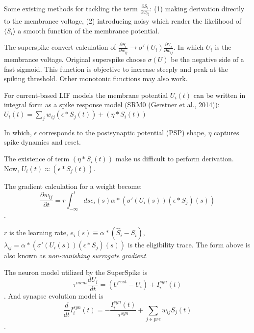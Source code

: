 Some existing methods for tackling the term $\frac{\partial S_i}{\partial w_{ij}}$:
(1) making derivation directly to the membrance voltage, 
(2) introducing noisy which render the likelihood of $\langle S_i \rangle$ a smooth function of the membrance potential.

The superspike convert calculation of $\frac{\partial S_i}{\partial w_{ij}}\rightarrow \sigma'(U_i)\frac{\partial U_i}{\partial w_{ij}}$.
In which $U_i$ is the membrance voltage.
Original superspike choose $\sigma(U)$ be the negative side of a fast sigmoid.
This function is objective to increase steeply and peak at the spiking threshold.
Other monotonic functions may also work.

For current-based LIF models the membrane potential $U_i(t)$ can be written in integral form as 
a spike response model (SRM0 (Gerstner et al., 2014)):
$U_i(t) = \sum_j w_{ij} (\epsilon * S_j(t)) + (\eta * S_i(t))$ 



In which, $\epsilon$ corresponds to the postsynaptic potential (PSP) shape, $\eta$ captures 
spike dynamics and reset.

The existence of term $(\eta * S_i(t))$ make us difficult to perform derivation. Now, 
$U_i(t)\approx (\epsilon * S_j(t))$.

The gradient calculation for a weight become:
$$\frac{\partial w_{ij}}{\partial t}=r\int_{-\infty}^t ds e_i(s) \alpha * (\sigma'(U_i(s))(\epsilon * S_j)(s))$$.

$r$ is the learning rate, $e_i(s)\equiv \alpha * (\hat S_i - S_i)$, $\lambda_{ij} = \alpha * (\sigma'(U_i(s))(\epsilon * S_j)(s))$
 is the eligibility trace. The form above is also known as \textit{non-vanishing surrogate gradient}.

The neuron model utilized by the SuperSpike is $$\tau^{mem}\frac{dU_i}{dt} = (U^{rest} -U_i) +I_i^{syn}(t)$$.
And synapse evolution model is $$\frac{d}{dt} I_i^{syn}(t) =-\frac{I_i^{syn}(t)}{\tau^{syn}} + \sum_{j\in pre}w_{ij}S_j(t)$$.





